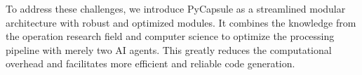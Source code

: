 To address these challenges, we introduce PyCapsule as a streamlined modular architecture with robust and optimized modules. 
It combines the knowledge from the operation research field and computer science to optimize the processing pipeline with merely two AI agents. This greatly reduces the computational overhead and facilitates more efficient and reliable code generation.
